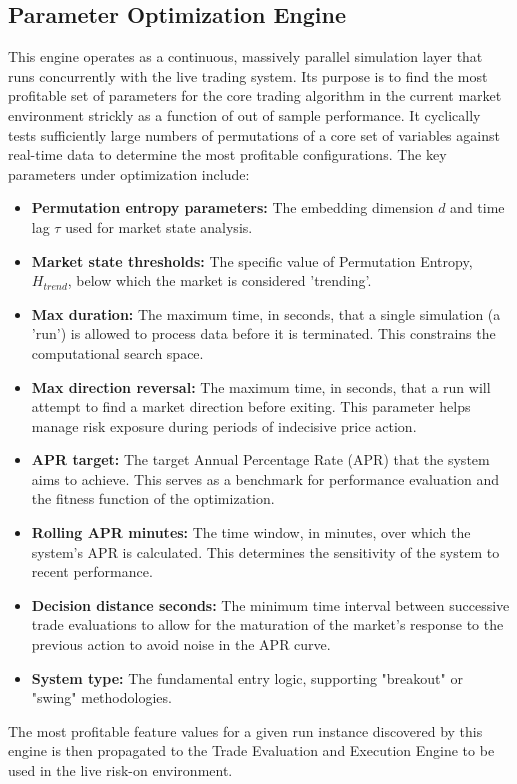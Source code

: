\documentclass[11pt]{article}
\begin{document}
\subsection{Parameter Optimization Engine}
This engine operates as a continuous, massively parallel simulation layer that runs concurrently with the live trading system. Its purpose is to find the most profitable set of parameters for the core trading algorithm in the current market environment strickly as a function of out of sample performance. It cyclically tests sufficiently large numbers of permutations of a core set of variables against real-time data to determine the most profitable configurations. The key parameters under optimization include:
\begin{itemize}
    \item \textbf{Permutation entropy parameters:} The embedding dimension $d$ and time lag $\tau$ used for market state analysis.
    \item \textbf{Market state thresholds:} The specific value of Permutation Entropy, $H_{trend}$, below which the market is considered 'trending'.
    \item \textbf{Max duration:} The maximum time, in seconds, that a single simulation (a 'run') is allowed to process data before it is terminated. This constrains the computational search space.
    \item \textbf{Max direction reversal:} The maximum time, in seconds, that a run will attempt to find a market direction before exiting. This parameter helps manage risk exposure during periods of indecisive price action.
    \item \textbf{APR target:} The target Annual Percentage Rate (APR) that the system aims to achieve. This serves as a benchmark for performance evaluation and the fitness function of the optimization.
    \item \textbf{Rolling APR minutes:} The time window, in minutes, over which the system's APR is calculated. This determines the sensitivity of the system to recent performance.
    \item \textbf{Decision distance seconds:} The minimum time interval between successive trade evaluations to allow for the maturation of the market's response to the previous action to avoid noise in the APR curve.
    \item \textbf{System type:} The fundamental entry logic, supporting "breakout" or "swing" methodologies.
\end{itemize}
The most profitable feature values for a given run instance discovered by this engine is then propagated to the Trade Evaluation and Execution Engine to be used in the live risk-on environment.
\end{document}
